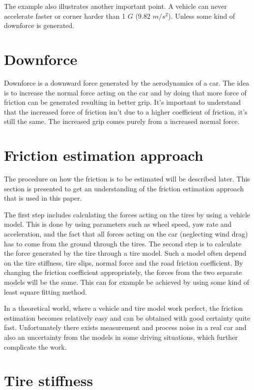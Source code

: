 The example also illustrates another important point. A vehicle can never accelerate faster or corner harder than 1 $ G $ (9.82 $ m/s^2 $). Unless some kind of downforce is generated. 

\section{Downforce}
Downforce is a downward force generated by the aerodynamics of a car. The idea is to increase the normal force acting on the car and by doing that more force of friction can be generated resulting in better grip. It's important to understand that the increased force of friction isn't due to a higher coefficient of friction, it's still the same. The increased grip comes purely from a increased normal force.

\section{Friction estimation approach}

The procedure on how the friction is to be estimated will be described later. This section is presented to get an understanding of the friction estimation approach that is used in this paper.

The first step includes calculating the forces acting on the tires by using a vehicle model. This is done by using parameters such as wheel speed, yaw rate and acceleration, and the fact that all forces acting on the car (neglecting wind drag) has to come from the ground through the tires. The second step is to calculate the force generated by the tire through a tire model. Such a model often depend on the tire stiffness, tire slips, normal force and the road friction coefficient. By changing the friction coefficient appropriately, the forces from the two separate models will be the same. This can for example be achieved by using some kind of least square fitting method. 

In a theoretical world, where a vehicle and tire model work perfect, the friction estimation becomes relatively easy and can be obtained with good certainty quite fast. Unfortunately there exists measurement and process noise in a real car and also an uncertainty from the models in some driving situations, which further complicate the work.

\section{Tire stiffness}

